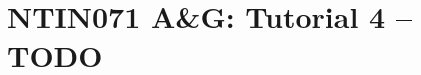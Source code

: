 \documentclass[a4paper,12pt]{amsart}
\begin{document}
\thispagestyle{empty}

\section*{NTIN071 A\&G: Tutorial 4 -- TODO}



   
\end{document}
